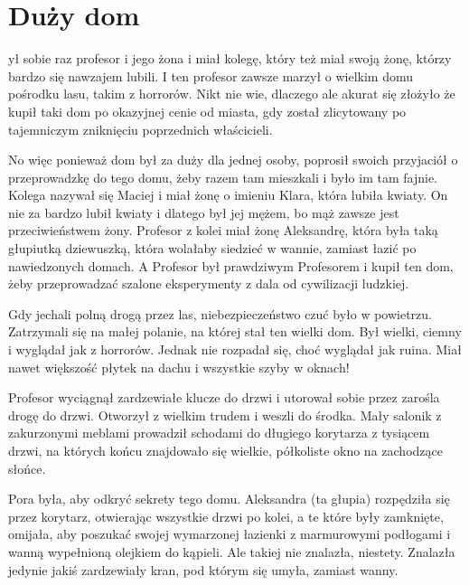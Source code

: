 \chapter{Duży dom}



ył sobie raz profesor i jego żona i miał kolegę, który też miał swoją żonę, którzy bardzo się nawzajem lubili.
I ten profesor zawsze marzył o wielkim domu pośrodku lasu, takim z horrorów.
Nikt nie wie, dlaczego ale akurat się złożyło że kupił taki dom po okazyjnej cenie od miasta, gdy został zlicytowany po tajemniczym zniknięciu poprzednich właścicieli.

No więc ponieważ dom był za duży dla jednej osoby, poprosił swoich przyjaciół o przeprowadzkę do tego domu, żeby razem tam mieszkali i było im tam fajnie.
Kolega nazywał się Maciej i miał żonę o imieniu Klara, która lubiła kwiaty.
On nie za bardzo lubił kwiaty i dlatego był jej mężem, bo mąż zawsze jest przeciwieństwem żony.
Profesor z kolei miał żonę Aleksandrę, która była taką głupiutką dziewuszką, która wolałaby siedzieć w wannie, zamiast łazić po nawiedzonych domach. A Profesor był prawdziwym Profesorem i kupił ten dom, żeby przeprowadzać szalone eksperymenty z dala od cywilizacji ludzkiej.

Gdy jechali polną drogą przez las, niebezpieczeństwo czuć było w powietrzu.
Zatrzymali się na małej polanie, na której stał ten wielki dom.
Był wielki, ciemny i wyglądał jak z horrorów. 
Jednak nie rozpadał się, choć wyglądał jak ruina.
Miał nawet większość płytek na dachu i wszystkie szyby w oknach!

Profesor wyciągnął zardzewiałe klucze do drzwi i utorował sobie przez zarośla drogę do drzwi.
Otworzył z wielkim trudem i weszli do środka.
Mały salonik z zakurzonymi meblami prowadził schodami do długiego korytarza z tysiącem drzwi, na których końcu znajdowało się wielkie, półkoliste okno na zachodzące słońce.

Pora była, aby odkryć sekrety tego domu.
Aleksandra (ta głupia) rozpędziła się przez korytarz, otwierając wszystkie drzwi po kolei, a te które były zamknięte, omijała, aby poszukać swojej wymarzonej łazienki z marmurowymi podłogami i wanną wypełnioną olejkiem do kąpieli. Ale takiej nie znalazła, niestety. Znalazła jedynie jakiś zardzewiały kran, pod którym się umyła, zamiast wanny. 

